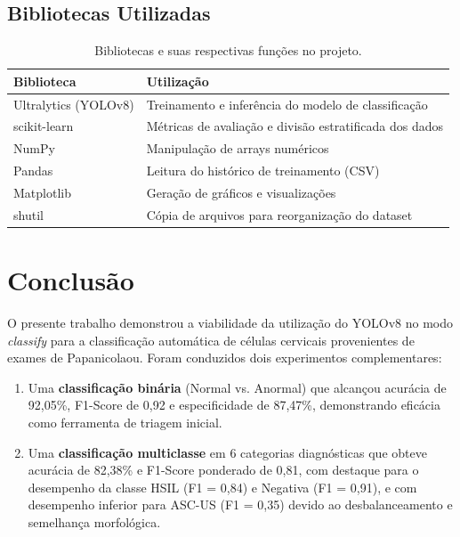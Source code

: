 \documentclass[12pt, a4paper]{article}
\begin{document}
\subsection{Bibliotecas Utilizadas}

\begin{table}[H]
\centering
\caption{Bibliotecas e suas respectivas funções no projeto.}
\label{tab:bibliotecas}
\begin{tabular}{ll}
\toprule
\textbf{Biblioteca} & \textbf{Utilização} \\
\midrule
Ultralytics (YOLOv8) & Treinamento e inferência do modelo de classificação \\
scikit-learn         & Métricas de avaliação e divisão estratificada dos dados \\
NumPy                & Manipulação de arrays numéricos \\
Pandas               & Leitura do histórico de treinamento (CSV) \\
Matplotlib           & Geração de gráficos e visualizações \\
shutil               & Cópia de arquivos para reorganização do dataset \\
\bottomrule
\end{tabular}
\end{table}

\section{Conclusão}

O presente trabalho demonstrou a viabilidade da utilização do YOLOv8 no modo \textit{classify} para a classificação automática de células cervicais provenientes de exames de Papanicolaou. Foram conduzidos dois experimentos complementares:

\begin{enumerate}
    \item Uma \textbf{classificação binária} (Normal vs. Anormal) que alcançou acurácia de 92,05\%, F1-Score de 0,92 e especificidade de 87,47\%, demonstrando eficácia como ferramenta de triagem inicial.

    \item Uma \textbf{classificação multiclasse} em 6 categorias diagnósticas que obteve acurácia de 82,38\% e F1-Score ponderado de 0,81, com destaque para o desempenho da classe HSIL (F1 = 0,84) e Negativa (F1 = 0,91), e com desempenho inferior para ASC-US (F1 = 0,35) devido ao desbalanceamento e semelhança morfológica.
\end{enumerate}
\end{document}
